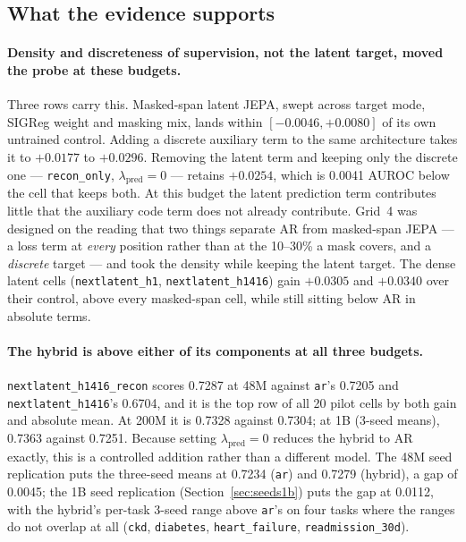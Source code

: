 \documentclass[11pt,a4paper]{article}
\newcommand{\code}[1]{\texttt{\small #1}}
\begin{document}
\subsection{What the evidence supports}

\paragraph{Density and discreteness of supervision, not the latent target, moved
the probe at these budgets.}
Three rows carry this. Masked-span latent JEPA, swept across target mode,
SIGReg weight and masking mix, lands within $[-0.0046, +0.0080]$ of its own
untrained control. Adding a discrete auxiliary term to the same architecture
takes it to $+0.0177$ to $+0.0296$. Removing the latent term and keeping only
the discrete one --- \code{recon\_only}, $\lambda_{\mathrm{pred}} = 0$ ---
retains $+0.0254$, which is 0.0041 AUROC below the cell that keeps both. At
this budget the latent prediction term contributes little that the auxiliary
code term does not already contribute. Grid~4 was designed on the reading that
two things separate AR from masked-span JEPA --- a loss term at \emph{every}
position rather than at the 10--30\% a mask covers, and a \emph{discrete}
target --- and took the density while keeping the latent target. The dense
latent cells (\code{nextlatent\_h1}, \code{nextlatent\_h1416}) gain $+0.0305$
and $+0.0340$ over their control, above every masked-span cell, while still
sitting below AR in absolute terms.

\paragraph{The hybrid is above either of its components at all three budgets.}
\code{nextlatent\_h1416\_recon} scores 0.7287 at 48M against \code{ar}'s 0.7205
and \code{nextlatent\_h1416}'s 0.6704, and it is the top row of all 20 pilot
cells by both gain and absolute mean. At 200M it is 0.7328 against 0.7304; at
1B (3-seed means), 0.7363 against 0.7251. Because setting
$\lambda_{\mathrm{pred}} = 0$ reduces the hybrid to AR exactly, this is a
controlled addition rather than a different model. The 48M seed replication
puts the three-seed means at 0.7234 (\code{ar}) and 0.7279 (hybrid), a gap of
0.0045; the 1B seed replication (Section~\ref{sec:seeds1b}) puts the gap at
0.0112, with the hybrid's per-task 3-seed range above \code{ar}'s on four
tasks where the ranges do not overlap at all (\code{ckd}, \code{diabetes},
\code{heart\_failure}, \code{readmission\_30d}).
\end{document}
